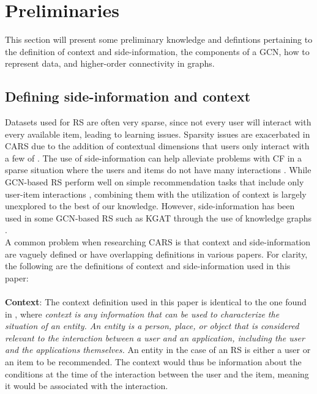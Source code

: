 \section{Preliminaries}\label{sec:preliminaries}
This section will present some preliminary knowledge and defintions pertaining to the definition of context and side-information, the components of a GCN, how to represent data, and higher-order connectivity in graphs.

\subsection{Defining side-information and context}\label{subsec:define_context_sideinfo}
Datasets used for RS are often very sparse, since not every user will interact with every available item, leading to learning issues.
Sparsity issues are exacerbated in CARS due to the addition of contextual dimensions that users only interact with a few of \cite{SparsityCARS}.
The use of side-information can help alleviate problems with CF in a sparse situation where the users and items do not have many interactions \cite{KGAT}.
While GCN-based RS perform well on simple recommendation tasks that include only user-item interactions \cite{NGCF,LightGCN}, combining them with the utilization of context is largely unexplored to the best of our knowledge.
However, side-information has been used in some GCN-based RS such as KGAT through the use of knowledge graphs \cite{KGAT}.\\
A common problem when researching CARS is that context and side-information are vaguely defined or have overlapping definitions in various papers.
For clarity, the following are the definitions of context and side-information used in this paper:
\\\\
\textbf{Context}:
The context definition used in this paper is identical to the one found in \cite{contextDefinition}, where \textit{context is any information that can be used to characterize the situation of an entity. An entity is a person, place, or object that is considered relevant to the interaction between a user and an application, including the user and the applications themselves.}
An entity in the case of an RS is either a user or an item to be recommended.
The context would thus be information about the conditions at the time of the interaction between the user and the item, meaning it would be associated with the interaction.
